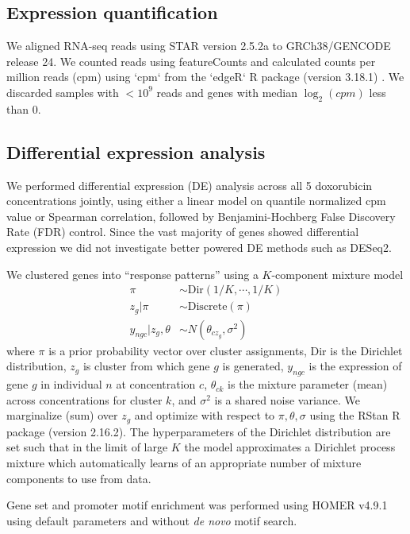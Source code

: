 \documentclass{article}
\begin{document}
{\subsection*{Expression quantification}

We aligned RNA-seq reads using STAR version 2.5.2a \cite{Dobin2013} to GRCh38/GENCODE release 24. We counted reads using featureCounts \cite{Liao2014} and calculated counts per million reads (cpm) using `cpm` from the `edgeR` R package (version 3.18.1) \cite{Robinson2010}. We discarded samples with $<10^9$ reads and genes with median $\log_2(cpm)$ less than $0$.

\subsection*{Differential expression analysis} 

We performed differential expression (DE) analysis across all 5 doxorubicin concentrations jointly, using either a linear model on quantile normalized cpm value or Spearman correlation, followed by Benjamini-Hochberg False Discovery Rate (FDR) control. Since the vast majority of genes showed differential expression we did not investigate better powered DE methods such as DESeq2. 

We clustered genes into ``response patterns'' using a $K$-component mixture model 
\begin{align}
\pi &\sim \text{Dir}(1/K,\cdots,1/K) \nonumber \\ 
z_g | \pi &\sim \text{Discrete}(\pi) \nonumber \\
y_{ngc} | z_g, \theta &\sim N( \theta_{cz_g}, \sigma^2 )
\label{eq:mixture}
\end{align}
where $\pi$ is a prior probability vector over cluster assignments, Dir is the Dirichlet distribution, $z_g$ is cluster from which gene $g$ is generated, $y_{ngc}$ is the expression of gene $g$ in individual $n$ at concentration $c$, $\theta_{ck}$ is the mixture parameter (mean) across concentrations for cluster $k$, and $\sigma^2$ is a shared noise variance. 
We marginalize (sum) over $z_g$ and optimize with respect to $\pi, \theta, \sigma$ using the RStan R package (version 2.16.2). 
The hyperparameters of the Dirichlet distribution are set such that in the limit of large $K$ the model approximates a Dirichlet process mixture \cite{maceachern1998estimating} which automatically learns of an appropriate number of mixture components to use from data. 

Gene set and promoter motif enrichment was performed using HOMER v4.9.1\cite{heinz2010simple} using default parameters and without \emph{de novo} motif search. 

}
\end{document}
